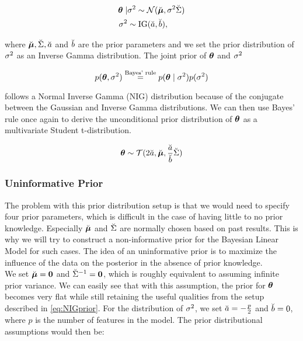 \begin{equation} \label{eq:NIGprior}
    \begin{aligned}
        \bm{\theta} \mid &\sigma^2 \sim  \mathcal{N}(\breve{\bm{\mu}}, \sigma^2 \breve{\Sigma}) \\
        \sigma^2 &\sim \text{IG}(\breve{a}, \breve{b}),
    \end{aligned}
\end{equation}

where $\breve{\bm{\mu}}, \breve{\Sigma}, \breve{a}$ and $\breve{b}$ are the prior parameters and we set the prior distribution of $\sigma^2$ as an Inverse Gamma distribution.
The joint prior of $\bm{\theta}$ and $\sigma^2$

\begin{equation*}
    p(\bm{\theta}, \sigma^2) \overset{\text{Bayes' rule}}{=} p(\bm{\theta} \mid \sigma^2) p(\sigma^2)
\end{equation*}

follows a Normal Inverse Gamma (NIG) distribution because of the conjugate between the Gaussian and Inverse Gamma distributions.
We can then use Bayes' rule once again to derive the unconditional prior distribution of $\bm{\theta}$ as a multivariate Student t-distribution. 

\begin{equation*}
    \bm{\theta} \sim \mathcal{T}(2 \breve{a}, \breve{\bm{\mu}}, \frac{\breve{a}}{\breve{b}} \breve{\Sigma})
\end{equation*}

\subsubsection*{Uninformative Prior}
The problem with this prior distribution setup is that we would need to specify four prior parameters, which is difficult in the case of having little to no prior knowledge.
Especially $\breve{\bm{\mu}}$ and $\breve{\Sigma}$ are normally chosen based on past results.
This is why we will try to construct a non-informative prior for the Bayesian Linear Model for such cases.
The idea of an uninformative prior is to maximize the influence of the data on the posterior in the absence of prior knowledge.\\

We set $\breve{\bm{\mu}} = \bm{0}$ and $\breve{\Sigma}^{-1} = \bm{0}$, which is roughly equivalent to assuming infinite prior variance.
We can easily see that with this assumption, the prior for $\bm{\theta}$ becomes very flat while still retaining the useful qualities from the setup described in \eqref{eq:NIGprior}.
For the distribution of $\sigma^2$, we set $\breve{a} = - \frac{p}{2}$ and $\breve{b} = 0$, where $p$ is the number of features in the model.
The prior distributional assumptions would then be:

